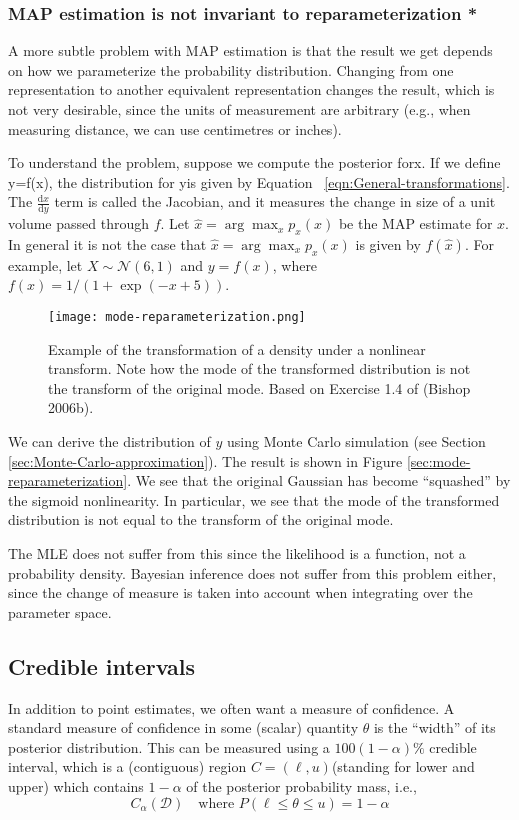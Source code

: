 \subsubsection{MAP estimation is not invariant to reparameterization *}
A more subtle problem with MAP estimation is that the result we get depends on how we parameterize the probability distribution. Changing from one representation to another equivalent representation changes the result, which is not very desirable, since the units of measurement are arbitrary (e.g., when measuring distance, we can use centimetres or inches).

To understand the problem, suppose we compute the posterior forx. If we define y=f(x), the distribution for yis given by Equation ~\ref{eqn:General-transformations}. The $\frac{\mathrm{d}x}{\mathrm{d}y}$ term is called the Jacobian, and it measures the change in size of a unit volume passed
through $f$. Let $\hat{x}=\arg\max_x p_x(x)$ be the MAP estimate for $x$. In general it is not the case that $\hat{x}=\arg\max_x p_x(x)$ is given by $f(\hat{x})$. For example, let $X \sim \mathcal{N}(6,1)$ and $y=f(x)$, where $f(x)=1/(1+\exp(-x+5))$. 

\begin{figure}[hbtp]
\centering
    \texttt{[image: mode-reparameterization.png]}
\caption{Example of the transformation of a density under a nonlinear transform. Note how the mode of the transformed distribution is not the transform of the original mode. Based on Exercise 1.4 of (Bishop 2006b).}
\label{fig:mode-reparameterization} 
\end{figure}

We can derive the distribution of $y$ using Monte Carlo simulation (see Section \ref{sec:Monte-Carlo-approximation}). The result is shown in Figure \ref{sec:mode-reparameterization}. We see that the original Gaussian has become “squashed” by the sigmoid nonlinearity. In particular, we see that the mode of the transformed distribution is not equal to the transform of the original mode.

The MLE does not suffer from this since the likelihood is a function, not a probability density. Bayesian inference does not suffer from this problem either, since the change of measure is taken into account when integrating over the parameter space.


\subsection{Credible intervals}
\label{sec:Credible-intervals}
In addition to point estimates, we often want a measure of confidence. A standard measure of confidence in some (scalar) quantity $\theta$ is the “width” of its posterior distribution. This can be measured using a $100(1−\alpha)\%$ credible interval, which is a (contiguous) region $C=(\ell,u)$(standing for lower and upper) which contains $1−\alpha$ of the posterior probability mass, i.e.,
\begin{equation}
C_{\alpha}(\mathcal{D}) \quad \text{where } P(\ell \leq \theta \leq u)=1-\alpha
\end{equation}

